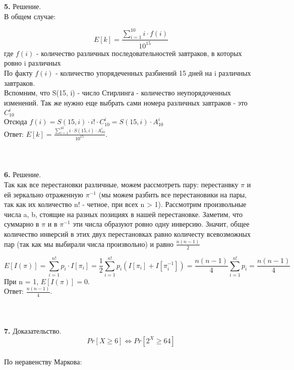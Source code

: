 \documentclass[12pt,a4paper]{scrartcl}
\begin{document}
\noindent \textbf{5.}
Решение.\\
В общем случае:

$$
E[k] = \frac{\sum\limits_{i = 1}^{10} i \cdot f(i)}{10^{15}}
$$
где $f(i)$ - количество различных последовательностей завтраков, в которых ровно i различных\\
По факту $f(i)$ - количество упорядеченных разбиений 15 дней на i различных  завтраков. \\
Вспомним, что S(15, i) - число Стирлинга - количество неупорядоченных изменений. Так же нужно еще выбрать сами номера различных завтраков - это $C_{10}^i$\\
Отсюда $f(i) = S(15, i) \cdot i! \cdot C_{10}^i = S(15, i) \cdot A_{10}^i$ 
\\ Ответ: $E[k] = \frac{\sum\limits_{i = 1}^{10} i \cdot S(15, i) \cdot A_{10}^i}{10^{15}}$.
\\ \\ \\ \\



\noindent \textbf{6.}
Решение.\\
Так как все перестановки различные, можем рассмотреть пару: перестанвку $\pi$ и ей зеркально отраженную $\pi^{-1}$ (мы можем разбить все перестановики на пары, так как их количество n! - четное, при всех n > 1). Рассмотрим произвольные числа a, b, стоящие на разных позициях в нашей перестановке. Заметим, что суммарно в $\pi$ и в $\pi^{-1}$ эти числа образуют ровно одну инверсию. Значит, общее количество инверсий в этих двух перестановках равно количесту всевозможных пар (так как мы выбирали числа произвольно) и равно $\frac{n(n-1)}{2}$

$$
E[I(\pi)] = \sum_{i = 1}^{n!} p_i \cdot I[\pi_i] = \frac{1}{2} \sum_{i = 1}^{n!} p_i (I[\pi_i] + I[\pi^{-1}_i]) = \frac{n(n-1)}{4} \sum_{i = 1}^{n!} p_i = \frac{n(n-1)}{4}
$$
При n = 1, $E[I(\pi)] = 0$.
\\ Ответ: $\frac{n(n-1)}{4}$.
\\ \\ \\ \\



\noindent \textbf{7.}
Доказательство.\\

$$
Pr[X \geq 6] \Leftrightarrow Pr[2^{X} \geq 64]
$$ \\
По неравенству Маркова:\\
\end{document}
